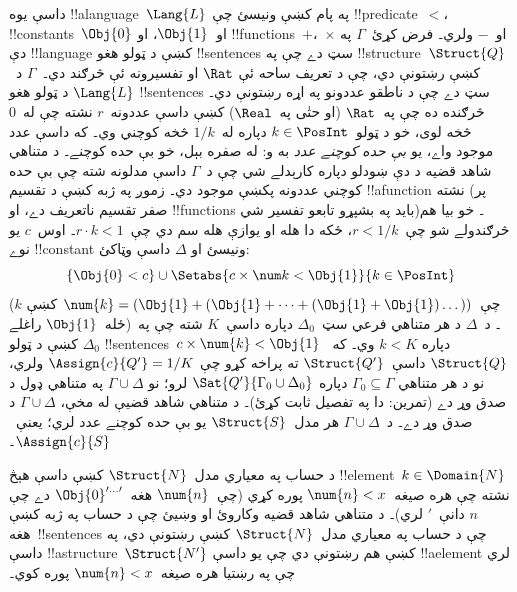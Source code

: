 \documentclass[../../../include/open-logic-section]{subfiles}
\begin{document}
{\begin{ex}
داسې يوه !!a{language}~$\Lang{L}$ په پام کښې ونيسئ چې
!!{predicate}~$<$، !!{constant}s~$\Obj{0}$ او~$\Obj{1}$، او
!!{function}s~$+$،~$\times$ او~$-$ ولري۔ فرض کړئ~$\Gamma$ په دې
!!{language} کښې د ټولو هغو !!{sentence}s سټ دے چې په
!!{structure}~$\Struct{Q}$ کښې رښتونې دي، چې د تعريف ساحه ئې
$\Rat$ او تفسيرونه ئې څرګند دي۔~$\Gamma$ د~$\Lang{L}$ د ټولو هغو
!!{sentence}s سټ دے چې د ناطقو عددونو په اړه رښتونې دي۔ څرګنده ده
چې په~$\Rat$ (او حتٰی په~$\Real$) کښې داسې عددونه~$r$ نشته چې
له~$0$ څخه لوی، خو د ټولو~$k \in \PosInt$ دپاره له~$1/k$ څخه
کوچني وي۔ که داسې عدد موجود واے، يو \emph{بې حده کوچنے عدد} به
و: له صفره بېل، خو بې حده کوچنے۔ د متناهي شاهد قضيه د دې ښودلو
دپاره کارېدلے شي چې د~$\Gamma$ داسې مدلونه شته چې بې حده کوچني
عددونه پکښې موجود دي۔ زموږ په ژبه کښې د تقسيم !!a{function} نشته
(پر صفر تقسيم ناتعريف دے، او !!{function}s بايد په بشپړو تابعو
تفسير شي)۔ خو بيا هم څرګندولے شو چې~$r < 1/k$، ځکه دا هله او يوازې
هله سم دي چې~$r \cdot k < 1$۔ اوس~$c$ يو نوے !!{constant} ونيسئ او
$\Delta$ داسې وټاکئ:
\[
\{\Obj{0} < c\}
\cup \Setabs{ c \times \num k < \Obj{1} }{k \in \PosInt}
\]
(چې~$\num{k} = (\Obj{1} + (\Obj{1} + \dots + (\Obj{1} +
\Obj{1})\dots))$ کښې $k$ ځله~$\Obj{1}$ راغلے)۔ د~$\Delta$ د هر
متناهي فرعي سټ~$\Delta_0$ دپاره داسې~$K$ شته چې په~$\Delta_0$
کښې د ټولو !!{sentence}s~$c \times \num{k} < \Obj{1}$ دپاره
$k < K$ وي۔ که~$\Struct{Q}$ داسې~$\Struct{Q'}$ ته پراخه کړو چې
$\Assign{c}{Q'} = 1/K$ ولري، نو د هر متناهي
$\Gamma_0 \subseteq \Gamma$ دپاره
$\Sat{Q'}{\Gamma_0 \cup \Delta_0}$ لرو؛ نو
$\Gamma \cup \Delta$ په متناهي ډول د صدق وړ دے (تمرين: دا په
تفصيل ثابت کړئ)۔ د متناهي شاهد قضيې له مخې،
$\Gamma \cup \Delta$ د صدق وړ دے۔ د~$\Gamma \cup \Delta$ هر
مدل~$\Struct{S}$ يو بې حده کوچنے عدد لري؛ يعنې~$\Assign{c}{S}$۔
\end{ex}
}{}

\begin{prob}
د حساب په معياري مدل~$\Struct{N}$ کښې داسې هېڅ
!!{element}~$k \in \Domain{N}$ نشته چې هره صيغه~$\num{n} < x$
پوره کړي (چې~$\num{n}$ هغه~$\Obj{0}^{\prime\dots\prime}$ دے چې
$n$ دانې~$\prime$ لري)۔ د متناهي شاهد قضيه وکاروئ او وښيئ چې د
حساب په ژبه کښې هغه~!!{sentence}s چې د حساب په معياري
مدل~$\Struct{N}$ کښې رښتونې دي، په داسې !!a{structure}~$\Struct{N'}$
کښې هم رښتونې دي چې يو داسې !!a{element} لري چې په رښتيا هره
صيغه~$\num{n} < x$ پوره کوي۔
\end{prob}
\tagendprob
\end{document}
